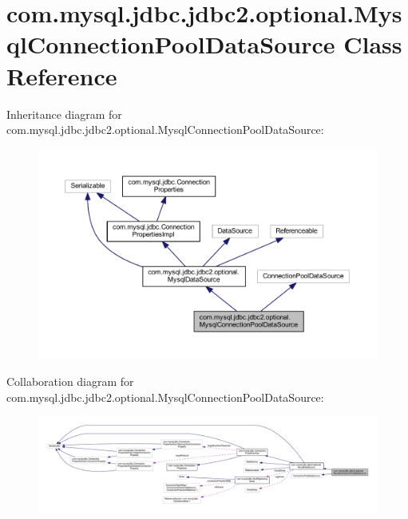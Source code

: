 \hypertarget{classcom_1_1mysql_1_1jdbc_1_1jdbc2_1_1optional_1_1_mysql_connection_pool_data_source}{}\section{com.\+mysql.\+jdbc.\+jdbc2.\+optional.\+Mysql\+Connection\+Pool\+Data\+Source Class Reference}
\label{classcom_1_1mysql_1_1jdbc_1_1jdbc2_1_1optional_1_1_mysql_connection_pool_data_source}


Inheritance diagram for com.\+mysql.\+jdbc.\+jdbc2.\+optional.\+Mysql\+Connection\+Pool\+Data\+Source\+:
\nopagebreak
\begin{figure}[H]
\begin{center}
\leavevmode
\includegraphics[width=350pt]{classcom_1_1mysql_1_1jdbc_1_1jdbc2_1_1optional_1_1_mysql_connection_pool_data_source__inherit__graph}
\end{center}
\end{figure}


Collaboration diagram for com.\+mysql.\+jdbc.\+jdbc2.\+optional.\+Mysql\+Connection\+Pool\+Data\+Source\+:
\nopagebreak
\begin{figure}[H]
\begin{center}
\leavevmode
\includegraphics[width=350pt]{classcom_1_1mysql_1_1jdbc_1_1jdbc2_1_1optional_1_1_mysql_connection_pool_data_source__coll__graph}
\end{center}
\end{figure}
